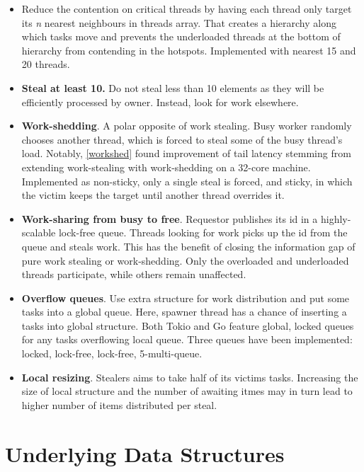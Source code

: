 \documentclass[12pt,a4paper,twoside]{report}
\begin{document}
\begin{itemize}
    \item Reduce the contention on critical threads by having each thread only target its \textit{n} nearest neighbours in threads array. That creates a hierarchy along which tasks move and prevents the underloaded threads at the bottom of hierarchy from contending in the hotspots. Implemented with nearest 15 and 20 threads.
    \item \textbf{Steal at least 10.} Do not steal less than 10 elements as they will be efficiently processed by owner. Instead, look for work elsewhere. 
    \item \textbf{Work-shedding}. A polar opposite of work stealing. Busy worker randomly chooses another thread, which is forced to steal some of the busy thread's load. Notably, \ref{workshed} found improvement of tail latency stemming from extending work-stealing with work-shedding on a 32-core machine. Implemented as non-sticky, only a single steal is forced, and sticky, in which the victim keeps the target until another thread overrides it. 
    \item \textbf{Work-sharing from busy to free}. Requestor publishes its id in a highly-scalable lock-free queue. Threads looking for work picks up the id from the queue and steals work. This has the benefit of closing the information gap of pure work stealing or work-shedding. Only the overloaded and underloaded threads participate, while others remain unaffected.
    \item \textbf{Overflow queues}. Use extra structure for work distribution and put some tasks into a global queue. Here, spawner thread has a chance of inserting a tasks into global structure. Both Tokio \cite{Makingth53:online} and Go \cite{goprocgo14:online} feature global, locked queues for any tasks overflowing local queue. Three queues have been implemented: locked, lock-free, lock-free, 5-multi-queue. 
    \item \textbf{Local resizing}. Stealers aims to take half of its victims tasks. Increasing the size of local structure and the number of awaiting itmes may in turn lead to higher number of items distributed per steal. 
\end{itemize}



\section{Underlying Data Structures}
\end{document}
